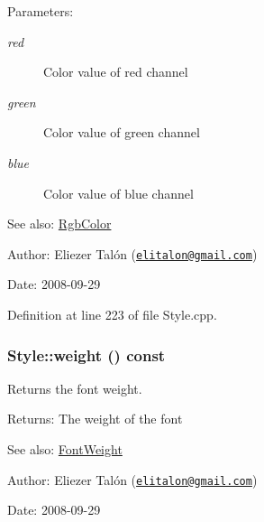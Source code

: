 \begin{Desc}
\item[Parameters:]
\begin{description}
\item[{\em red}]Color value of red channel \item[{\em green}]Color value of green channel \item[{\em blue}]Color value of blue channel\end{description}
\end{Desc}
\begin{Desc}
\item[See also:]\hyperlink{struct_rgb_color}{RgbColor}\end{Desc}
\begin{Desc}
\item[Author:]Eliezer Talón (\href{mailto:elitalon@gmail.com}{\tt elitalon@gmail.com}) \end{Desc}
\begin{Desc}
\item[Date:]2008-09-29 \end{Desc}


Definition at line 223 of file Style.cpp.\hypertarget{class_style_9c2124b07762f0b72dea763ef01601ed}{
\subsubsection[weight]{ Style::weight () const}}
\label{class_style_9c2124b07762f0b72dea763ef01601ed}


Returns the font weight. 

\begin{Desc}
\item[Returns:]The weight of the font\end{Desc}
\begin{Desc}
\item[See also:]\hyperlink{_font_weight_8h_ecff23ba4a68486421bcea57e095fe66}{FontWeight}\end{Desc}
\begin{Desc}
\item[Author:]Eliezer Talón (\href{mailto:elitalon@gmail.com}{\tt elitalon@gmail.com}) \end{Desc}
\begin{Desc}
\item[Date:]2008-09-29 \end{Desc}


